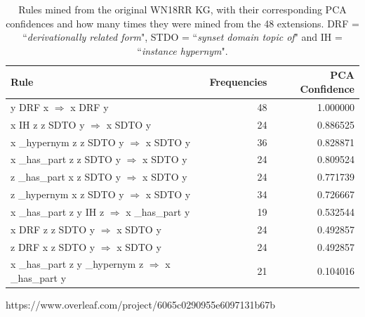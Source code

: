 \begin{table}
\begin{tabular}{lrr}
\toprule
                                                                                                      Rule &  Frequencies &  PCA Confidence \\
\midrule
                            y  DRF  x   $\Rightarrow$ x  DRF  y &           48 &        1.000000 \\
          x  IH  z  z  SDTO  y   $\Rightarrow$ x  SDTO  y &           24 &        0.886525 \\
                   x  \_hypernym  z  z  SDTO  y   $\Rightarrow$ x  SDTO  y &           36 &        0.828871 \\
                   x  \_has\_part  z  z  SDTO  y   $\Rightarrow$ x  SDTO  y &           24 &        0.809524 \\
                   z  \_has\_part  x  z  SDTO  y   $\Rightarrow$ x  SDTO  y &           24 &        0.771739 \\
                   z  \_hypernym  x  z  SDTO  y   $\Rightarrow$ x  SDTO  y &           34 &        0.726667 \\
                                      x  \_has\_part  z  y  IH  z   $\Rightarrow$ x  \_has\_part  y &           19 &        0.532544 \\
x  DRF  z  z  SDTO  y   $\Rightarrow$ x  SDTO  y &           24 &        0.492857 \\
z  DRF  x  z  SDTO  y   $\Rightarrow$ x  SDTO  y &           24 &        0.492857 \\
                                               x  \_has\_part  z  y  \_hypernym  z   $\Rightarrow$ x  \_has\_part  y &           21 &        0.104016 \\
\bottomrule
\end{tabular}
https://www.overleaf.com/project/6065c0290955e6097131b67b\caption{Rules mined from the original WN18RR KG, with their corresponding PCA confidences and how many times they were mined from the 48 extensions. DRF = ``\textit{derivationally related form}", STDO = ``\textit{synset domain topic of}" and IH = ``\textit{instance hypernym}".}
\label{wn18rr_original_rules_table_PCA}
\end{table}

